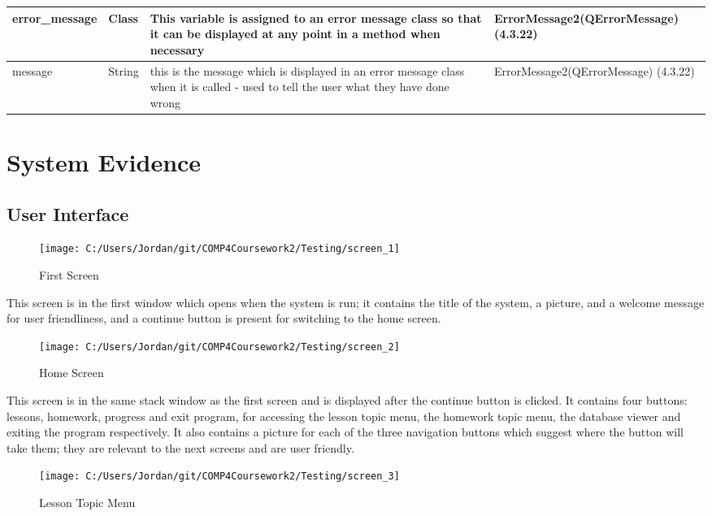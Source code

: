\begin{center}
\begin{longtable}{|p{3cm}|p{3cm}|p{4cm}|p{4cm}|}
error\_message & Class & This variable is assigned to an error message class so that it can be displayed at any point in a method when necessary & ErrorMessage2(QErrorMessage) (4.3.22) \\ \hline
message & String & this is the message which is displayed in an error message class when it is called - used to tell the user what they have done wrong & ErrorMessage2(QErrorMessage) (4.3.22) \\ \hline
\end{longtable}
\end{center}

\section{System Evidence}

\subsection{User Interface}

\begin{figure}[H]
    \label{fig: Second Screen}\caption{First Screen}
    \texttt{[image: C:/Users/Jordan/git/COMP4Coursework2/Testing/screen\_1]}
\end{figure}

This screen is in the first window which opens when the system is run; it contains the title of the system, a picture, and a welcome message for user friendliness, and a continue button is present for switching to the home screen.

\begin{figure}[H]
    \label{fig: Second Screen}\caption{Home Screen}
    \texttt{[image: C:/Users/Jordan/git/COMP4Coursework2/Testing/screen\_2]}
\end{figure}

This screen is in the same stack window as the first screen and is displayed after the continue button is clicked. It contains four buttons: lessons, homework, progress and exit program, for accessing the lesson topic menu, the homework topic menu, the database viewer and exiting the program respectively. It also contains a picture for each of the three navigation buttons which suggest where the button will take them; they are relevant to the next screens and are user friendly.

\begin{figure}[H]
    \label{fig: Second Screen}\caption{Lesson Topic Menu}
    \texttt{[image: C:/Users/Jordan/git/COMP4Coursework2/Testing/screen\_3]}
\end{figure}

